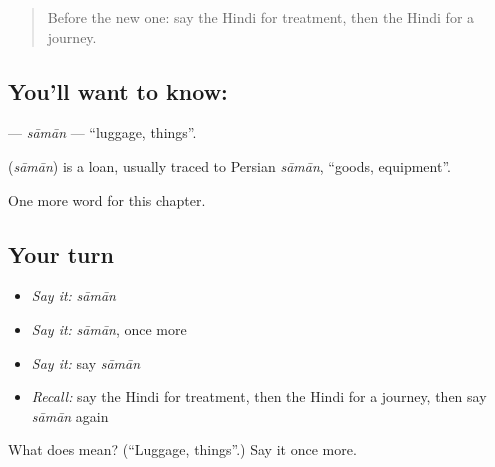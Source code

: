 \begin{quote}
Before the new one: say the Hindi for treatment, then the Hindi for a journey.
\end{quote}

\subsection*{You'll want to know: }
\textbf{} — \emph{sāmān} — \textquotedblleft{}luggage, things\textquotedblright{}.

\begin{cousinweb}
\textbf{} (\emph{sāmān}) is a loan, usually traced to Persian \emph{sāmān}, \textquotedblleft{}goods, equipment\textquotedblright{}.
\end{cousinweb}

\begin{grammarlens}[title={What you've built}]
One more word for this chapter.
\end{grammarlens}

\subsection*{Your turn}
\begin{itemize}
\raggedright
  \item \emph{Say it:} \emph{sāmān}
  \item \emph{Say it:} \emph{sāmān}, once more
  \item \emph{Say it:} say \emph{sāmān}
  \item \emph{Recall:} say the Hindi for treatment, then the Hindi for a journey, then say \emph{sāmān} again
\end{itemize}

\begin{tcolorbox}[breakable,colback=teal!4,colframe=teal!35!black,title={Before you move on}]
What does  mean? (\textquotedblleft{}Luggage, things\textquotedblright{}.) Say it once more.
\end{tcolorbox}
